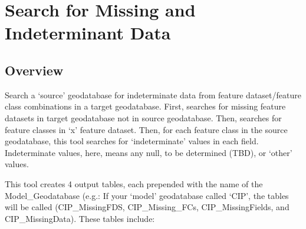 \documentclass[openany]{book}
\theoremstyle{definition}
\theoremstyle{definition}
\theoremstyle{definition}
\theoremstyle{remark}
\begin{document}
\hypertarget{indtSearch}{\chapter{Search for Missing and Indeterminant
Data}\label{indtSearch}}

\section{Overview}\label{overview-8}

Search a `source' geodatabase for indeterminate data from feature
dataset/feature class combinations in a target geodatabase. First,
searches for missing feature datasets in target geodatabase not in
source geodatabase. Then, searches for feature classes in `x' feature
dataset. Then, for each feature class in the source geodatabase, this
tool searches for `indeterminate' values in each field. Indeterminate
values, here, means any null, to be determined (TBD), or `other' values.

This tool creates 4 output tables, each prepended with the name of the
Model\_Geodatabase (e.g.: If your `model' geodatabase called `CIP', the
tables will be called (CIP\_MissingFDS, CIP\_Missing\_FCs,
CIP\_MissingFields, and CIP\_MissingData). These tables include:
\end{document}

